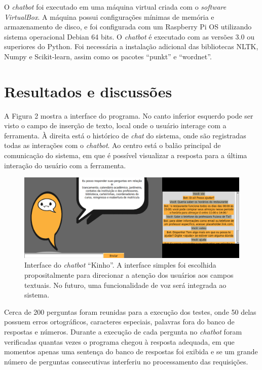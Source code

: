 \documentclass[12pt]{article}
\begin{document}
O {\itshape chatbot} foi executado em uma máquina virtual criada com o {\itshape software VirtualBox}. A máquina possui configurações mínimas de memória e armazenamento de disco, e foi configurada com um Raspberry Pi OS utilizando sistema operacional Debian 64 bits. O {\itshape chatbot} é executado com as versões 3.0 ou superiores do Python. Foi necessária a instalação adicional das bibliotecas NLTK, Numpy e Scikit-learn, assim como os pacotes “punkt” e “wordnet”.


\section{Resultados e discussões}

A Figura 2 mostra a interface do programa. No canto inferior esquerdo pode ser visto o campo de inserção de texto, local onde o usuário interage com a ferramenta. À direita está o histórico de {\itshape chat} do sistema, onde são registradas todas as interações com o {\itshape chatbot}. Ao centro está o balão principal de comunicação do sistema, em que é possível visualizar a resposta para a última interação do usuário com a ferramenta.

\begin{figure}[ht]
\centering
\includegraphics[width=1\textwidth]{fig2.png}
\caption{Interface do {\itshape chatbot} “Kinho”. A interface simples foi escolhida propositalmente para direcionar a atenção dos usuários aos campos textuais. No futuro, uma funcionalidade de voz será integrada ao sistema.}
\label{fig:exampleFig2}
\end{figure}

Cerca de 200 perguntas foram reunidas para a execução dos testes, onde 50 delas possuem erros ortográficos, caracteres especiais, palavras fora do banco de respostas e números. Durante a execução de cada pergunta no {\itshape chatbot} foram verificadas quantas vezes o programa chegou à resposta adequada, em que momentos apenas uma sentença do banco de respostas foi exibida e se um grande número de perguntas consecutivas interferiu no processamento das requisições.
\end{document}
